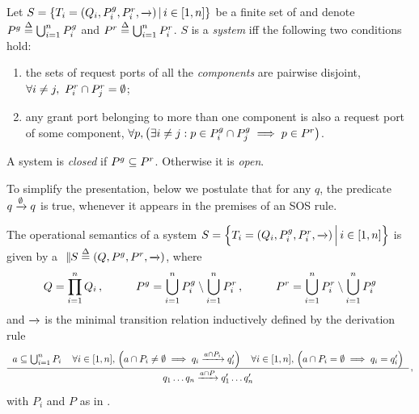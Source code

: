 \begin{definition}[System]
  \label{defn:system}
  Let $S = \setdef{T_i = (Q_i, \pin_i, \pout_i, \goesto{})}{i \in [1,n]}$ be
  a finite set of \compmodel{} and denote $\pin \bydef{=} \bigcup_{i=1}^n
  \pin_i$ and $\pout \bydef{=} \bigcup_{i=1}^n \pout_i$.  $S$ is a
  \emph{system} iff the following two conditions hold:
  \begin{enumerate}
  \item the sets of request ports of all the \emph{components} are pairwise
    disjoint, \ie $\forall i \neq j,\ \pout_i \cap \pout_j = \emptyset$;
  \item any grant port belonging to more than one component is also a
    request port of some component, \ie $\forall p, \left(\exists i \neq j:
    p \in \pin_i \cap \pin_j \implies p \in \pout\right)$.
  \end{enumerate}

  A system is \emph{closed} if $\pin \subseteq \pout$.  Otherwise it is
  \emph{open}.
\end{definition}

To simplify the presentation, below we postulate that for any $q$, the
predicate $q \goesto{\emptyset} q$ is true, whenever it appears in the
premises of an SOS rule.

\begin{definition}
  \label{defn:composition}
  The operational semantics of a system $S = \Setdef{T_i = (Q_i, \pin_i,
    \pout_i, \goesto{})}{i \in [1,n]}$ is given by a \compmodel{}
  $\compose[S] \bydef{=} (Q, \pin, \pout, \goesto{})$, where
  \begin{equation}
    \label{eq:composition:parts}
    Q = \prod_{i=1}^n Q_i\,,
    \hspace{1cm}
    \pin = \bigcup_{i=1}^n \pin_i \setminus \bigcup_{i=1}^n \pout_i\,,
    \hspace{1cm}
    \pout = \bigcup_{i=1}^n \pout_i \setminus \bigcup_{i=1}^n \pin_i 
  \end{equation}
  and $\goesto{}$ is the minimal transition relation inductively defined by
  the derivation rule
  \begin{equation}
    \label{eq:composition:transitions}
    \renewcommand{\arraystretch}{1.5}
    \derrule[3]{
      a \subseteq \bigcup_{i=1}^n P_i &
      \forall i \in [1,n],\, \Big(a \cap P_i \neq \emptyset \implies 
        q_i \goesto{a \cap P_i} q_i'\Big) &
      \forall i \in [1,n],\, \Big(a \cap P_i = \emptyset \implies 
        q_i = q_i'\Big) 
    }{
      q_1 \dots q_n \goesto{a \cap P} q_1' \dots q_n'
    }\,,
  \end{equation}
  with $P_i$ and $P$ as in .
\end{definition}

